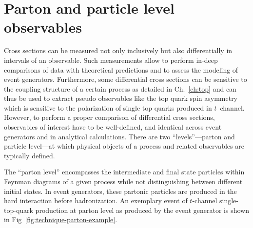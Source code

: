 \section{Parton and particle level observables}
\label{sec:technique-levels}

Cross sections can be measured not only inclusively but also differentially in intervals of an observable. Such measurements allow to perform in-deep comparisons of data with theoretical predictions and to assess the modeling of event generators. Furthermore, some differential cross sections can be sensitive to the coupling structure of a certain process as detailed in Ch.~\ref{ch:top} and can thus be used to extract pseudo observables like the top quark spin asymmetry which is sensitive to the polarization of single top quarks produced in $t$~channel. However, to perform a proper comparison of differential cross sections, observables of interest have to be well-defined, and identical across event generators and in analytical calculations. There are two ``levels''---parton and particle level---at which physical objects of a process and related observables are typically defined.

The ``parton level'' encompasses the intermediate and final state particles within Feynman diagrams of a given process while not distinguishing between different initial states. In event generators, these partonic particles are produced in the hard interaction before hadronization. An exemplary event of $t$-channel single-top-quark production at parton level as produced by the \POWHEG event generator is shown in Fig~\ref{fig:technique-parton-example}. 


